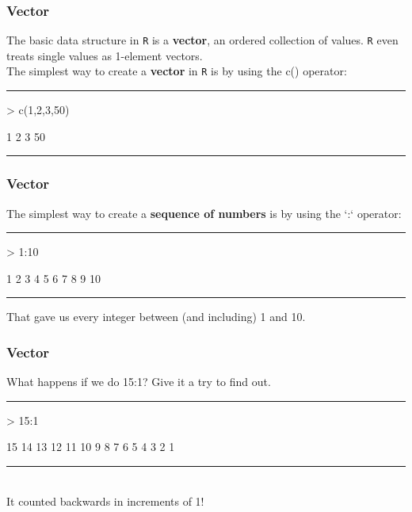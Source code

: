 \documentclass{beamer}
\begin{document}
\begin{frame}[fragile]
	\frametitle{Vector}
	The basic data structure in \texttt{R} is a \textbf{vector}, an ordered collection of values. \texttt{R} even treats single values as 1-element vectors.\\
	The simplest way to create a \textbf{vector} in \texttt{R} is by using the c() operator:
	\rule{\textwidth}{0.4pt}
\begin{Schunk}
\begin{Sinput}
> c(1,2,3,50)
\end{Sinput}
\begin{Soutput}
[1]  1  2  3 50
\end{Soutput}
\end{Schunk}
\rule{\textwidth}{0.4pt}
\vspace{20pt}
\end{frame}

\begin{frame}[fragile]
	\frametitle{Vector}
	The simplest way to create a \textbf{sequence of numbers} is by using the `:` operator:
	\rule{\textwidth}{0.4pt}
\begin{Schunk}
\begin{Sinput}
> 1:10
\end{Sinput}
\begin{Soutput}
 [1]  1  2  3  4  5  6  7  8  9 10
\end{Soutput}
\end{Schunk}
\rule{\textwidth}{0.4pt}
\vspace{20pt}
That gave us every integer between (and including) 1 and 10.
\end{frame}

\begin{frame}[fragile]
	\frametitle{Vector}
	What happens if we do 15:1? Give it a try to find out.
	\pause
	\rule{\textwidth}{0.4pt}
\begin{Schunk}
\begin{Sinput}
> 15:1
\end{Sinput}
\begin{Soutput}
 [1] 15 14 13 12 11 10  9  8  7  6  5  4  3  2  1
\end{Soutput}
\end{Schunk}
\rule{\textwidth}{0.4pt}\\
\vspace{20pt}
It counted backwards in increments of 1!
\end{frame}
\end{document}
